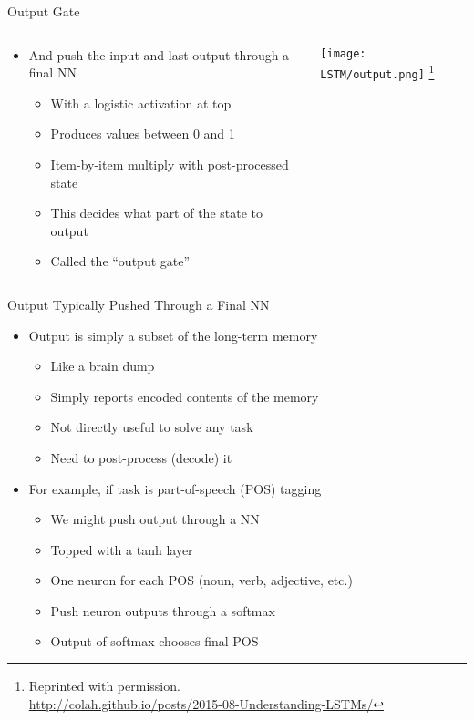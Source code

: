 \documentclass[aspectratio=169]{beamer}
\begin{document}
\begin{frame}{Output Gate}

\begin{columns}
\begin{column}{0.5\textwidth}
\begin{itemize}
	\item And push the input and last output through a final NN
	\begin{itemize}
		\item With a logistic activation at top
		\item Produces values between 0 and 1
		\item Item-by-item multiply with post-processed state
		\item This decides what part of the state to output
		\item Called the ``output gate''
	\end{itemize}
\end{itemize}
\end{column}
\begin{column}{0.5\textwidth}
\texttt{[image: LSTM/output.png]}
\footnote{Reprinted with permission.\\ \hspace{1.7em}\url{http://colah.github.io/posts/2015-08-Understanding-LSTMs/}}
\end{column}
\end{columns}
\end{frame}
\begin{frame}{Output Typically Pushed Through a Final NN}

\begin{itemize}
	\item Output is simply a subset of the long-term memory
	\begin{itemize}
		\item Like a brain dump
		\item Simply reports encoded contents of the memory
		\item Not directly useful to solve any task
		\item Need to post-process (decode) it
	\end{itemize}
        \item For example, if task is part-of-speech (POS) tagging
        \begin{itemize}
                \item We might push output through a NN
		\item Topped with a tanh layer
		\item One neuron for each POS (noun, verb, adjective, etc.)
                \item Push neuron outputs through a softmax
		\item Output of softmax chooses final POS
        \end{itemize}
\end{itemize}
\end{frame}
\end{document}
